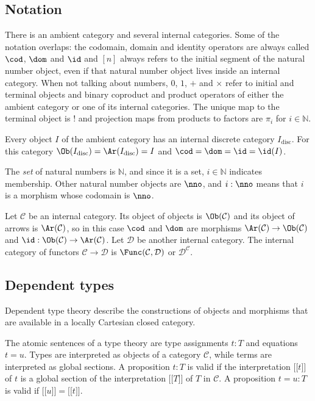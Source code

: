 \documentclass{tac}
\newcommand\hide[1]{}
\newcommand\cat\mathcal
\newcommand\N{\mathbb N}
\newcommand\disc{_{\mathrm{disc}}}
\newcommand\bang{!}
\newcommand\of{:}
\newcommand\db[1]{{[\![}#1{]\!]}}
\begin{document}
\subsection{Notation} There is an ambient category and several internal categories. Some of the notation overlaps: the codomain, domain and identity operators are always called $\cod$, $\dom$ and $\id$ and $[n]$ always refers to the initial segment of the natural number object, even if that natural number object lives inside an internal category. When not talking about numbers, $0$, $1$, $+$ and $\times$ refer to initial and terminal objects and binary coproduct and product operators of either the ambient category or one of its internal categories. The unique map to the terminal object is $\bang$ and projection maps from products to factors are $\pi_i$ for $i\in \N$.

Every object $I$ of the ambient category has an internal discrete category $I\disc$. For this category $\Ob(I\disc)=\Ar(I\disc)=I$ and $\cod=\dom=\id=\id(I)$.

The \emph{set} of natural numbers is $\N$, and since it is a set, $i\in \N$ indicates membership. Other natural number objects are $\nno$, and $i\of\nno$ means that $i$ is a morphism whose codomain is $\nno$.

Let $\cat C$ be an internal category. Its object of objects is $\Ob(\cat C)$ and its object of arrows is $\Ar(\cat C)$, so in this case $\cod$ and $\dom$ are morphisms $\Ar(\cat C)\to\Ob(\cat C)$ and $\id\of\Ob(\cat C)\to\Ar(\cat C)$. Let $\cat D$ be another internal category. The internal category of functors $\cat C\to\cat D$ is $\Func(\cat C,\cat D)$ or $\cat D^{\cat C}$.

\hide{What is below this line has not been adapted yet}

\hide{removed ELCCCs}

\subsection{Dependent types}
Dependent type theory describe the constructions of objects and morphisms that are available in a locally Cartesian closed category.

The atomic sentences of a type theory are type assignments $t\of T$ and equations $t=u$. Types are interpreted as objects of a category $\cat C$, while terms are interpreted as global sections. A proposition $t\of T$ is valid if the interpretation $\db t$ of $t$ is a global section of the interpretation $\db T$ of $T$ in $\cat C$. A proposition $t=u\of T$ is valid if $\db u=\db t$. 
\end{document}
